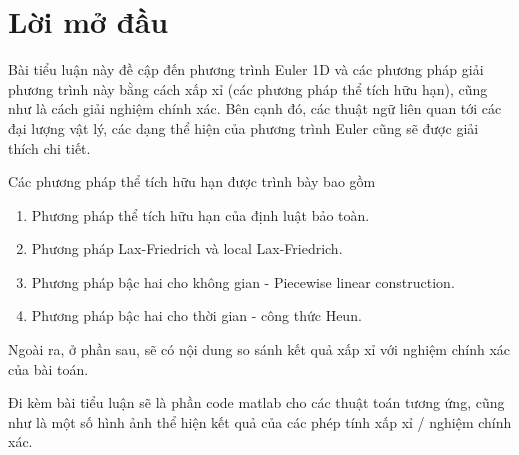 \section*{Lời mở đầu}

\noindent Bài tiểu luận này đề cập đến phương trình Euler 1D và các phương pháp giải phương trình này bằng cách xấp xỉ (các phương pháp thể tích hữu hạn), cũng như là cách giải nghiệm chính xác. Bên cạnh đó, các thuật ngữ liên quan tới các đại lượng vật lý, các dạng thể hiện của phương trình Euler cũng sẽ được giải thích chi tiết.

\noindent Các phương pháp thể tích hữu hạn được trình bày bao gồm

\begin{enumerate}
    \item Phương pháp thể tích hữu hạn của định luật bảo toàn.
    \item Phương pháp Lax-Friedrich và local Lax-Friedrich.
    \item Phương pháp bậc hai cho không gian - Piecewise linear construction.
    \item Phương pháp bậc hai cho thời gian - công thức Heun.
\end{enumerate}

Ngoài ra, ở phần sau, sẽ có nội dung so sánh kết quả xấp xỉ với nghiệm chính xác của bài toán.

Đi kèm bài tiểu luận sẽ là phần code matlab cho các thuật toán tương ứng, cũng như là một số hình ảnh thể hiện kết quả của các phép tính xấp xỉ / nghiệm chính xác.